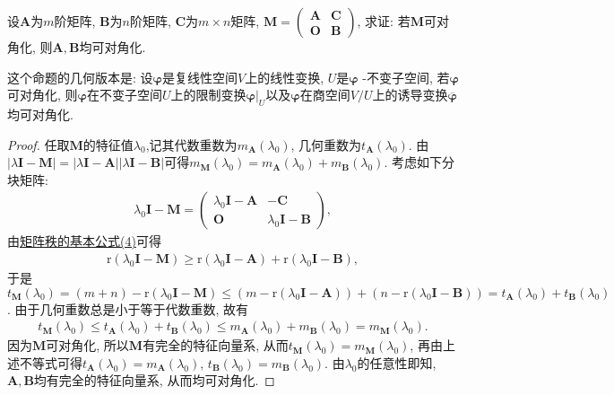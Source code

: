 \documentclass[../../main.tex]{subfiles}
\begin{document}
\begin{proposition}\label{proposition:没有公共的特征值的可对角化矩阵的分块也可对角化 逆命题}
设\(\boldsymbol{A}\)为\(m\)阶矩阵, \(\boldsymbol{B}\)为\(n\)阶矩阵, \(\boldsymbol{C}\)为\(m\times n\)矩阵, \(\boldsymbol{M} = \begin{pmatrix}
\boldsymbol{A}&\boldsymbol{C}\\
\boldsymbol{O}&\boldsymbol{B}
\end{pmatrix}\), 求证: 若\(\boldsymbol{M}\)可对角化, 则\(\boldsymbol{A},\boldsymbol{B}\)均可对角化.
\end{proposition}
\begin{remark}
这个命题的几何版本是: 设\(\boldsymbol{\varphi}\)是复线性空间\(V\)上的线性变换, \(U\)是\(\boldsymbol{\varphi}\) -不变子空间, 若\(\boldsymbol{\varphi}\)可对角化, 则\(\boldsymbol{\varphi}\)在不变子空间\(U\)上的限制变换\(\boldsymbol{\varphi}|_U\)以及\(\boldsymbol{\varphi}\)在商空间\(V/U\)上的诱导变换\(\overline{\boldsymbol{\varphi}}\)均可对角化. 
\end{remark}
\begin{proof} 
任取\(\boldsymbol{M}\)的特征值\(\lambda_0\),记其代数重数为\(m_{\boldsymbol{A}}(\lambda_0)\), 几何重数为\(t_{\boldsymbol{A}}(\lambda_0)\).  由\(|\lambda\boldsymbol{I}-\boldsymbol{M}| = |\lambda\boldsymbol{I} - \boldsymbol{A}||\lambda\boldsymbol{I} - \boldsymbol{B}|\)可得\(m_{\boldsymbol{M}}(\lambda_0) = m_{\boldsymbol{A}}(\lambda_0)+m_{\boldsymbol{B}}(\lambda_0)\). 考虑如下分块矩阵:
\begin{align*}
\lambda_0\boldsymbol{I} - \boldsymbol{M} = \begin{pmatrix}
\lambda_0\boldsymbol{I} - \boldsymbol{A}&-\boldsymbol{C}\\
\boldsymbol{O}&\lambda_0\boldsymbol{I} - \boldsymbol{B}
\end{pmatrix},
\end{align*}
由\hyperref[矩阵秩的基本公式4]{矩阵秩的基本公式(4)}可得
\begin{align*}
\mathrm{r}(\lambda_0\boldsymbol{I} - \boldsymbol{M})\geq \mathrm{r}(\lambda_0\boldsymbol{I} - \boldsymbol{A})+\mathrm{r}(\lambda_0\boldsymbol{I} - \boldsymbol{B}),
\end{align*}
于是\(t_{\boldsymbol{M}}(\lambda_0) = (m + n) - \mathrm{r}(\lambda_0\boldsymbol{I} - \boldsymbol{M})\leq (m - \mathrm{r}(\lambda_0\boldsymbol{I} - \boldsymbol{A}))+(n - \mathrm{r}(\lambda_0\boldsymbol{I} - \boldsymbol{B})) = t_{\boldsymbol{A}}(\lambda_0)+t_{\boldsymbol{B}}(\lambda_0)\). 由于几何重数总是小于等于代数重数, 故有
\begin{align*}
t_{\boldsymbol{M}}(\lambda_0)\leq t_{\boldsymbol{A}}(\lambda_0)+t_{\boldsymbol{B}}(\lambda_0)\leq m_{\boldsymbol{A}}(\lambda_0)+m_{\boldsymbol{B}}(\lambda_0) = m_{\boldsymbol{M}}(\lambda_0).
\end{align*}
因为\(\boldsymbol{M}\)可对角化, 所以\(\boldsymbol{M}\)有完全的特征向量系, 从而\(t_{\boldsymbol{M}}(\lambda_0) = m_{\boldsymbol{M}}(\lambda_0)\), 再由上述不等式可得\(t_{\boldsymbol{A}}(\lambda_0) = m_{\boldsymbol{A}}(\lambda_0)\), \(t_{\boldsymbol{B}}(\lambda_0) = m_{\boldsymbol{B}}(\lambda_0)\). 由\(\lambda_0\)的任意性即知, \(\boldsymbol{A},\boldsymbol{B}\)均有完全的特征向量系, 从而均可对角化. 
\end{proof}
\end{document}
